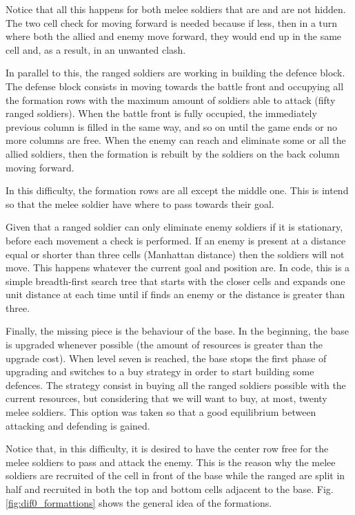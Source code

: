 \documentclass[conference]{IEEEtran}
\begin{document}
Notice that all this happens for both melee soldiers that are and are not hidden. The two cell check for moving forward is needed because if less, then in a turn where both the allied and enemy move forward, they would end up in the same cell and, as a result, in an unwanted clash.

In parallel to this, the ranged soldiers are working in building the defence block. The defense block consists in moving towards the battle front and occupying all the formation rows with the maximum amount of soldiers able to attack (fifty ranged soldiers). When the battle front is fully occupied, the immediately previous column is filled in the same way, and so on until the game ends or no more columns are free. When the enemy can reach and eliminate some or all the allied soldiers, then the formation is rebuilt by the soldiers on the back column moving forward.

In this difficulty, the formation rows are all except the middle one. This is intend so that the melee soldier have where to pass towards their goal. 

Given that a ranged soldier can only eliminate enemy soldiers if it is stationary, before each movement a check is performed. If an enemy is present at a distance equal or shorter than three cells (Manhattan distance) then the soldiers will not move. This happens whatever the current goal and position are. In code, this is a simple breadth-first search tree that starts with the closer cells and expands one unit distance at each time until if finds an enemy or the distance is greater than three.

Finally, the missing piece is the behaviour of the base. In the beginning, the base is upgraded whenever possible (the amount of resources is greater than the upgrade cost). When level seven is reached, the base stops the first phase of upgrading and switches to a buy strategy in order to start building some defences. The strategy consist in buying all the ranged soldiers possible with the current resources, but considering that we will want to buy, at most, twenty melee soldiers. This option was taken so that a good equilibrium between attacking and defending is gained.

Notice that, in this difficulty, it is desired to have the center row free for the melee soldiers to pass and attack the enemy. This is the reason why the melee soldiers are recruited of the cell in front of the base while the ranged are split in half and recruited in both the top and bottom cells adjacent to the base. Fig. \ref{fig:dif0_formattions} shows the general idea of the formations.
\end{document}
